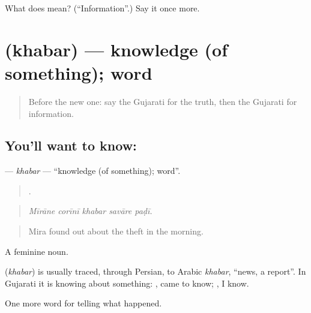 \begin{tcolorbox}[breakable,colback=teal!4,colframe=teal!35!black,title={Before you move on}]
What does  mean? (\textquotedblleft{}Information\textquotedblright{}.) Say it once more.
\end{tcolorbox}
\section[\texorpdfstring{\gu{ખબર} (khabar)}{ખબર (khabar)}]{ (khabar) — knowledge (of something); word}

\label{lesson:GU-C313-khabar}



\begin{quote}
Before the new one: say the Gujarati for the truth, then the Gujarati for information.
\end{quote}

\subsection*{You'll want to know: }
\textbf{} — \emph{khabar} — \textquotedblleft{}knowledge (of something); word\textquotedblright{}.

\begin{quote}
    .
\end{quote}

\begin{quote}
\emph{Mīrāne corīnī khabar savāre paḍī.}
\end{quote}

\begin{quote}
Mira found out about the theft in the morning.
\end{quote}

A feminine noun.

\begin{cousinweb}
\textbf{} (\emph{khabar}) is usually traced, through Persian, to Arabic \emph{khabar}, \textquotedblleft{}news, a report\textquotedblright{}. In Gujarati it is knowing about something: \textbf{ }, came to know; \textbf{  }, I know.
\end{cousinweb}

\begin{grammarlens}[title={What you've built}]
One more word for telling what happened.
\end{grammarlens}

